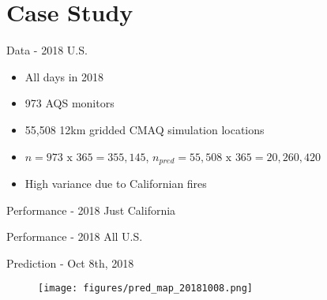 \documentclass{beamer}
\begin{document}
\section{Case Study}

\begin{frame}{Data - 2018 U.S.}
    \begin{itemize}
        \item All days in 2018
        \item 973 AQS monitors 
        \item 55,508 12km gridded CMAQ simulation locations
        \item $n = 973 \text{ x } 365 = 355,145$, $n_{pred} = 55,508 \text{ x } 365 = 20,260,420$
        \item High variance due to Californian fires
    \end{itemize}

    \begin{table}
        \centering
        \resizebox{0.5\textwidth}{!}{
            
        }
        \caption{Monthly summary statistics for AQS $PM_{2.5}$ in 2018.}
    \end{table}

\end{frame}


\begin{frame}{Performance - 2018 Just California}

    \begin{table}
        \centering
        
        \caption{ California in-sample RMSE for all combinations of spatial process and $\theta$ discretization schemes.}
    \end{table}


\end{frame}

\begin{frame}{Performance - 2018 All U.S.}

    \begin{table}
        \centering
        \resizebox{0.8\textwidth}{!}{
            
        }
        \caption{Full U.S. RMSE (95\% Prediction Interval Coverage Probability) for all combinations of CV type and Mat\'{e}rn $\nu$ parameter values.}
    \end{table}


\end{frame}

\begin{frame}{Prediction - Oct 8th, 2018}

\begin{figure}[h]
    \texttt{[image: figures/pred\_map\_20181008.png]}
    \vspace{-1cm}
\end{figure}

\end{frame}
\end{document}
